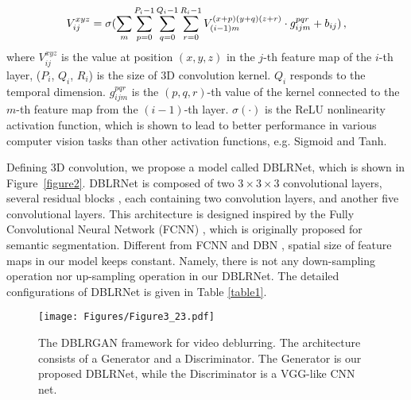 \documentclass[journal]{IEEEtran}
\begin{document}
\begin{equation}
\footnotesize
V_{ij}^{xyz} = \sigma (\sum\limits_m {\sum\limits_{p = 0}^{{P_i} - 1} {\sum\limits_{q = 0}^{{Q_i} - 1} {\sum\limits_{r = 0}^{{R_i} - 1} {V_{(i - 1)m}^{(x + p)(y + q)(z + r)} \cdot g_{ijm}^{pqr}}  + {b_{ij}}} } } ) \, ,
\end{equation}
where $V_{ij}^{xyz}$ is the value at position $(x,y,z)$ in the $j$-th feature map of the $i$-th layer, (${P_i}$, ${Q_i}$, ${R_i}$) is the size of 3D convolution kernel. ${Q_i}$ responds to the temporal dimension. $g_{ijm}^{pqr}$ is the $(p,q,r)$-th value of the kernel connected to the $m$-th feature map from the $(i-1)$-th layer. $\sigma\left(\cdot\right)$ is the ReLU nonlinearity activation function, which is shown to lead to better performance in various computer vision tasks than other activation functions, e.g. Sigmoid and Tanh.

Defining 3D convolution, we propose a model called DBLRNet, which is shown in Figure~\ref{figure2}. DBLRNet is composed of two $3 \times 3 \times 3$ convolutional layers, several residual blocks \cite{he2016deep}, each containing two convolution layers, and another five convolutional layers. This architecture is designed inspired by the Fully Convolutional Neural Network (FCNN) \cite{long2015fully}, which is originally proposed for semantic segmentation. Different from FCNN and DBN \cite{su2016deep}, spatial size of feature maps in our model keeps constant. Namely, there is not any down-sampling operation nor up-sampling operation in our DBLRNet. The detailed configurations of DBLRNet is given in Table \ref{table1}.

\begin{figure*}
	\centering
	\texttt{[image: Figures/Figure3\_23.pdf]}
    \caption{The DBLRGAN framework for video deblurring. The architecture consists of a Generator and a Discriminator. The Generator is our proposed DBLRNet, while the Discriminator is a VGG-like CNN net.}
	\label{figure3}
\end{figure*}
\end{document}
